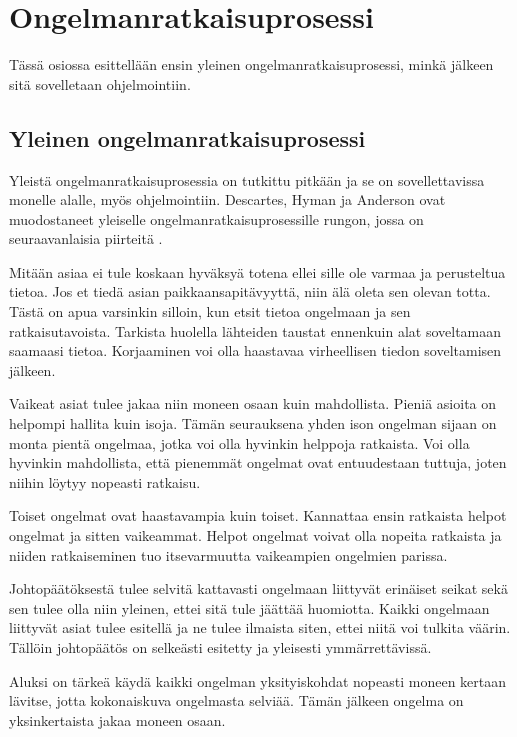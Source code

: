 \section{Ongelmanratkaisuprosessi}

Tässä osiossa esittellään ensin yleinen ongelmanratkaisuprosessi, minkä jälkeen
sitä sovelletaan ohjelmointiin.

\subsection{Yleinen ongelmanratkaisuprosessi}

Yleistä ongelmanratkaisuprosessia on tutkittu pitkään ja se on sovellettavissa
monelle alalle, myös ohjelmointiin. Descartes, Hyman ja Anderson ovat
muodostaneet yleiselle ongelmanratkaisuprosessille rungon, jossa on
seuraavanlaisia piirteitä \cite{Gries:1974:WTI:953057.810447}.

Mitään asiaa ei tule koskaan hyväksyä totena ellei sille ole varmaa ja
perusteltua tietoa. Jos et tiedä asian paikkaansapitävyyttä, niin älä oleta sen
olevan totta. Tästä on apua varsinkin silloin, kun etsit tietoa ongelmaan ja sen
ratkaisutavoista. Tarkista huolella lähteiden taustat ennenkuin alat soveltamaan
saamaasi tietoa. Korjaaminen voi olla haastavaa virheellisen tiedon soveltamisen
jälkeen.

Vaikeat asiat tulee jakaa niin moneen osaan kuin mahdollista. Pieniä asioita on
helpompi hallita kuin isoja. Tämän seurauksena yhden ison ongelman sijaan on
monta pientä ongelmaa, jotka voi olla hyvinkin helppoja ratkaista. Voi olla
hyvinkin mahdollista, että pienemmät ongelmat ovat entuudestaan tuttuja, joten
niihin löytyy nopeasti ratkaisu.

Toiset ongelmat ovat haastavampia kuin toiset. Kannattaa ensin ratkaista helpot
ongelmat ja sitten vaikeammat. Helpot ongelmat voivat olla nopeita ratkaista ja
niiden ratkaiseminen tuo itsevarmuutta vaikeampien ongelmien parissa.

Johtopäätöksestä tulee selvitä kattavasti ongelmaan liittyvät erinäiset seikat
sekä sen tulee olla niin yleinen, ettei sitä tule jäättää huomiotta. Kaikki
ongelmaan liittyvät asiat tulee esitellä ja ne tulee ilmaista siten, ettei niitä
voi tulkita väärin. Tällöin johtopäätös on selkeästi esitetty ja yleisesti
ymmärrettävissä.

Aluksi on tärkeä käydä kaikki ongelman yksityiskohdat nopeasti moneen kertaan
lävitse, jotta kokonaiskuva ongelmasta selviää. Tämän jälkeen ongelma on
yksinkertaista jakaa moneen osaan.

